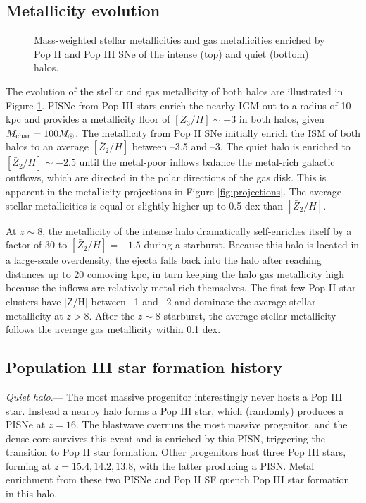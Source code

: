 \documentclass[apjl]{emulateapj}
\begin{document}
\subsection{Metallicity evolution}

\label{sec:Zevo}
\begin{figure}
  \caption{\label{fig:Zevo} Mass-weighted stellar metallicities and
    gas metallicities enriched by Pop II and Pop III SNe of the
    intense (top) and quiet (bottom) halos.}
\end{figure}

The evolution of the stellar and gas metallicity of both halos are
illustrated in Figure \ref{fig:Zevo}.  PISNe from Pop III stars enrich
the nearby IGM out to a radius of 10 kpc and provides a metallicity
floor of $[Z_3/H] \sim -3$ in both halos, given $M_{\rm char} = 100
\Ms$.  The metallicity from Pop II SNe initially enrich the ISM of
both halos to an average $[\bar{Z}_2/H]$ between --3.5 and --3.  The
quiet halo is enriched to $[\bar{Z}_2/H] \sim -2.5$ until the
metal-poor inflows balance the metal-rich galactic outflows, which are
directed in the polar directions of the gas disk.  This is apparent in
the metallicity projections in Figure \ref{fig:projections}.  The
average stellar metallicities is equal or slightly higher up to 0.5
dex than $[\bar{Z}_2/H]$.

At $z \sim 8$, the metallicity of the intense halo dramatically
self-enriches itself by a factor of 30 to $[\bar{Z}_2/H] = -1.5$
during a starburst.  Because this halo is located in a large-scale
overdensity, the ejecta falls back into the halo after reaching
distances up to 20 comoving kpc, in turn keeping the halo gas
metallicity high because the inflows are relatively metal-rich
themselves.  The first few Pop II star clusters have [Z/H] between --1
and --2 and dominate the average stellar metallicity at $z > 8$.
After the $z \sim 8$ starburst, the average stellar metallicity
follows the average gas metallicity within 0.1 dex.

\subsection{Population III star formation history}

\textit{Quiet halo}.--- The most massive progenitor interestingly
never hosts a Pop III star.  Instead a nearby halo forms a Pop III
star, which (randomly) produces a PISNe at $z=16$.  The blastwave
overruns the most massive progenitor, and the dense core survives this
event and is enriched by this PISN, triggering the transition to Pop
II star formation.  Other progenitors host three Pop III stars,
forming at $z = 15.4, 14.2, 13.8$, with the latter producing a PISN.
Metal enrichment from these two PISNe and Pop II SF quench Pop III
star formation in this halo.
\end{document}
